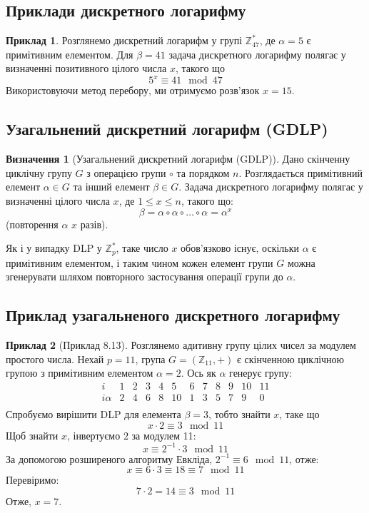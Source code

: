 \documentclass[12pt]{report}
\theoremstyle{definition}
\newtheorem{definition}{Визначення}[chapter]
\newtheorem{example}{Приклад}[chapter]
\theoremstyle{plain}
\begin{document}
\subsection{Приклади дискретного логарифму}

\begin{example}
Розглянемо дискретний логарифм у групі \( \mathbb{Z}^*_{47} \), де \( \alpha = 5 \) є примітивним елементом. Для \( \beta = 41 \) задача дискретного логарифму полягає у визначенні позитивного цілого числа \( x \), такого що
\[
5^x \equiv 41 \mod 47
\]
Використовуючи метод перебору, ми отримуємо розв'язок \( x = 15 \).
\end{example}

\subsection{Узагальнений дискретний логарифм (GDLP)}

\begin{definition}[Узагальнений дискретний логарифм (GDLP)]
Дано скінченну циклічну групу \( G \) з операцією групи \( \circ \) та порядком \( n \). Розглядається примітивний елемент \( \alpha \in G \) та інший елемент \( \beta \in G \). Задача дискретного логарифму полягає у визначенні цілого числа \( x \), де \( 1 \leq x \leq n \), такого що:
\[
\beta = \alpha \circ \alpha \circ \ldots \circ \alpha = \alpha^x
\]
(повторення \( \alpha \) \( x \) разів).
\end{definition}

Як і у випадку DLP у \( \mathbb{Z}^*_p \), таке число \( x \) обов'язково існує, оскільки \( \alpha \) є примітивним елементом, і таким чином кожен елемент групи \( G \) можна згенерувати шляхом повторного застосування операції групи до \( \alpha \).

\subsection{Приклад узагальненого дискретного логарифму}

\begin{example}[Приклад 8.13]
Розглянемо адитивну групу цілих чисел за модулем простого числа. Нехай \( p = 11 \), група \( G = (\mathbb{Z}_{11}, +) \) є скінченною циклічною групою з примітивним елементом \( \alpha = 2 \). Ось як \( \alpha \) генерує групу:
\[
\begin{array}{c|ccccccccccc}
i & 1 & 2 & 3 & 4 & 5 & 6 & 7 & 8 & 9 & 10 & 11 \\
\hline
i\alpha & 2 & 4 & 6 & 8 & 10 & 1 & 3 & 5 & 7 & 9 & 0 \\
\end{array}
\]
Спробуємо вирішити DLP для елемента \( \beta = 3 \), тобто знайти \( x \), таке що
\[
x \cdot 2 \equiv 3 \mod 11
\]
Щоб знайти \( x \), інвертуємо \( 2 \) за модулем 11:
\[
x \equiv 2^{-1} \cdot 3 \mod 11
\]
За допомогою розширеного алгоритму Евкліда, \( 2^{-1} \equiv 6 \mod 11 \), отже:
\[
x \equiv 6 \cdot 3 \equiv 18 \equiv 7 \mod 11
\]
Перевіримо:
\[
7 \cdot 2 = 14 \equiv 3 \mod 11
\]
Отже, \( x = 7 \).
\end{example}
\end{document}
